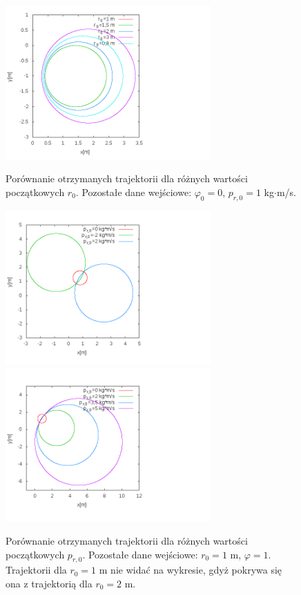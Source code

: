 \documentclass[11pt]{article}
\begin{document}
\begin{figure}[h!]
\begin{center}
\includegraphics[width=0.7\textwidth]{pro2.png}
\caption{Porównanie otrzymanych trajektorii dla różnych wartości początkowych $r_0$. Pozostałe dane wejściowe:
		$\varphi_0=0$, $p_{r,0}= 1$ kg$\cdot$m/s.}{\label{WR}}	
\end{center}
\end{figure}

\begin{figure}[h!]
\begin{center}
\includegraphics[width=0.7\textwidth]{ped.png}
\includegraphics[width=0.7\textwidth]{ped2.png}
\caption{Porównanie otrzymanych trajektorii dla różnych wartości początkowych $p_{r,0}$. Pozostałe dane wejściowe:
		$r_0=1$ m, $\varphi= 1$. Trajektorii dla $r_0=1$ m nie widać na wykresie, gdyż pokrywa się ona z trajektorią dla $r_0=2$ m.}{\label{WP}}	
\end{center}
\end{figure}
\end{document}
